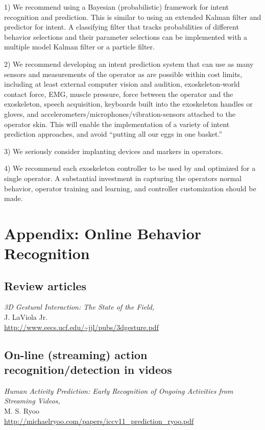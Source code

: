 \documentclass[letterpaper,12pt,fullpage]{article}
\begin{document}
1) We recommend using a Bayesian (probabilistic) framework for intent recognition
and prediction. This is similar to using an extended
Kalman filter and predictor for intent.
A classifying filter that tracks probabilities of different behavior selections
and their parameter selections can be implemented with a multiple model Kalman
filter or a particle filter.

2) We recommend developing an intent prediction system that can use
as many sensors and measurements of the operator as are possible within cost limits,
including at least external computer vision and audition, exoskeleton-world contact
force,
EMG, muscle pressure, force between the operator and the
exoskeleton,
speech acquisition, keyboards built into the exoskeleton handles or gloves,
and accelerometers/microphones/vibration-sensors attached to the operator skin.
This will enable the implementation of a variety of intent prediction approaches,
and avoid ``putting all our eggs in one basket.''

3) We seriously consider implanting devices and markers in operators.

4) We recommend each exoskeleton controller
to be used by and optimized for a single operator.
A substantial investment in capturing the operators normal behavior,
operator training and learning, and controller customization should be made.

\section{Appendix: Online Behavior Recognition}

\subsection{Review articles}

{\it 3D Gestural Interaction: The State of the Field,}\\
J. LaViola Jr.\\
\url{http://www.eecs.ucf.edu/~jjl/pubs/3dgesture.pdf}

\subsection{On-line (streaming) action recognition/detection in videos}

{\it Human Activity Prediction: Early Recognition of Ongoing Activities
from Streaming Videos,}\\
M. S. Ryoo\\
\url{http://michaelryoo.com/papers/iccv11_prediction_ryoo.pdf}
\end{document}

